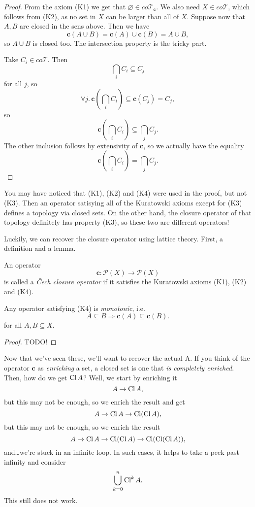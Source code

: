 \begin{proof}
    From the axiom (K1) we get that $\varnothing \in co\mathcal{T}_\mathbf{c}$. We also need $X \in co\mathcal{T}$, which follows from (K2), as no set in $X$ can be larger than all of $X$. Suppose now that $A, B$ are closed in the sens above. Then we have
    \[
        \mathbf{c}(A \cup B) = \mathbf{c}(A) \cup \mathbf{c}(B) = A \cup B,
    \]
    so $A \cup B$ is closed too. The intersection property is the tricky part.

    Take $C_i \in co\mathcal{T}$. Then
    \[
    \bigcap_i C_i \subseteq C_j
    \]
    for all $j$, so
    \[
        \forall j.\, \mathbf{c}\left(\bigcap_i C_i\right) \subseteq \mathbf{c}(C_j) = C_j,
    \]
    so
    \[
       \mathbf{c}\left(\bigcap_i C_i\right) \subseteq \bigcap_j C_j.
    \]
    The other inclusion follows by extensivity of $\mathbf{c}$, so we actually have the equality
    \[
      \mathbf{c}\left(\bigcap_i C_i\right) = \bigcap_j C_j.
    \]
\end{proof}

You may have noticed that (K1), (K2) and (K4) were used in the proof, but not (K3). Then an operator satisying all of the Kuratowski axioms except for (K3) defines a topology via closed sets. On the other hand, the closure operator of that topology definitely has property (K3), so these two are different operators!

Luckily, we can recover the closure operator using lattice theory. First, a definition and a lemma.

\begin{defn}
    An operator
    \[
        \mathbf{c}: \mathcal{P}(X) \to \mathcal{P}(X)
    \]
    is called a \emph{Čech closure operator} if it satisfies the Kuratowski axioms (K1), (K2) and (K4).
\end{defn}

\begin{lemma}
    Any operator satisfying (K4) is \emph{monotonic}, i.e.
    \[
        A \subseteq B \Rightarrow \mathbf{c}(A) \subseteq \mathbf{c}(B).
    \]
    for all $A, B \subseteq X$.
\end{lemma}
\begin{proof}
    TODO!
\end{proof}

Now that we've seen these, we'll want to recover the actual A. If you think of the operator $\mathbf{c}$ as \emph{enriching} a set, a closed set is one that \emph{is completely enriched}. Then, how do we get $\operatorname{Cl} A$? Well, we start by enriching it
\[
A \to \operatorname{Cl} A,
\]
but this may not be enough, so we enrich the result and get
\[
A \to \operatorname{Cl} A \to \operatorname{Cl} (\operatorname{Cl} A),
\]
but this may not be enough, so we enrich the result
\[
A \to \operatorname{Cl} A \to \operatorname{Cl} (\operatorname{Cl} A) \to \operatorname{Cl} (\operatorname{Cl} (\operatorname{Cl} A)),
\]
and\ldots we're stuck in an infinite loop. In such cases, it helps to take a peek past infinity and consider
\[
    \bigcup_{k=0}^n \operatorname{Cl}^k A.
\]
This still does not work.

